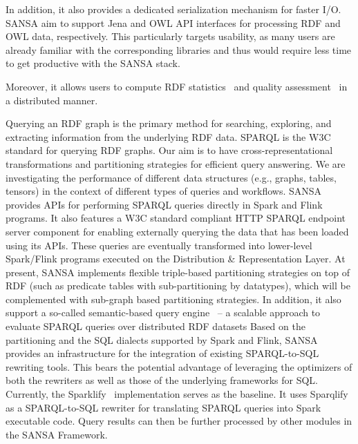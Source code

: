 In addition, it also provides a dedicated serialization mechanism for faster I/O. 
SANSA aim to support Jena and \gls{OWL} \gls{API} interfaces for processing \gls{RDF} and \gls{OWL} data, respectively.
This particularly targets usability, as many users are already familiar with the corresponding libraries and thus would require less time to get productive with the SANSA stack.

Moreover, it allows users to compute \gls{RDF} statistics~\cite{sejdiu-2018-dist-lod-stats-iswc} and quality assessment~\cite{sejdiu-2019-sansa-dist-quality-assessment-iswc} in a distributed manner.


Querying an \gls{RDF} graph is the primary method for searching, exploring, and extracting information from the underlying \gls{RDF} data.
\gls{SPARQL} is the \gls{W3C} standard for querying \gls{RDF} graphs.
Our aim is to have cross-representational transformations and partitioning strategies for efficient query answering. We are investigating the performance of different data structures (e.g., graphs, tables, tensors) in the context of different types of queries and workflows.
SANSA provides \gls{API}s for performing \gls{SPARQL} queries directly in Spark and Flink programs.
It also features a \gls{W3C} standard compliant HTTP \gls{SPARQL} endpoint server component for enabling externally querying the data that has been loaded using its \gls{API}s. These queries are eventually transformed into lower-level Spark/Flink programs executed on the Distribution \& Representation Layer.
At present, SANSA implements flexible triple-based partitioning strategies on top of \gls{RDF} (such as predicate tables with sub-partitioning by datatypes), which will be complemented with sub-graph based partitioning strategies.
In addition, it also support a so-called semantic-based query engine~\cite{sejdiu-2019-sansa-semantic-based-semantics} -- a scalable approach to evaluate \gls{SPARQL} queries over distributed \gls{RDF} datasets
Based on the partitioning and the SQL dialects supported by Spark and Flink, SANSA provides an infrastructure for the integration of existing SPARQL-to-SQL rewriting tools. 
This bears the potential advantage of leveraging the optimizers of both the rewriters as well as those of the underlying frameworks for SQL.
Currently, the Sparklify~\cite{2019-sansa-sparklify-iswc} implementation serves as the baseline.
It uses Sparqlify as a SPARQL-to-SQL rewriter for translating \gls{SPARQL} queries into Spark executable code.
Query results can then be further processed by other modules in the SANSA Framework.

